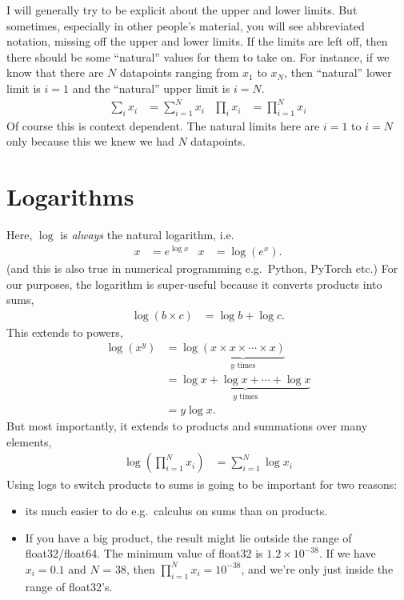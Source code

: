 \documentclass{article}
\begin{document}
I will generally try to be explicit about the upper and lower limits.
But sometimes, especially in other people's material, you will see abbreviated notation, missing off the upper and lower limits.
If the limits are left off, then there should be some ``natural'' values for them to take on.
For instance, if we know that there are $N$ datapoints ranging from $x_1$ to $x_N$, then ``natural'' lower limit is $i=1$ and the ``natural'' upper limit is $i=N$.
\begin{align}
  \sum_i x_i &= \sum_{i=1}^N x_i & \prod_i x_i &= \prod_{i=1}^N x_i
\end{align}
Of course this is context dependent.  The natural limits here are $i=1$ to $i=N$ only because this we knew we had $N$ datapoints.

\section{Logarithms}
Here, $\log$ is \textit{always} the natural logarithm, i.e.\
\begin{align}
  x &= e^{\log x} & x &= \log(e^x).
\end{align}
(and this is also true in numerical programming e.g.\ Python, PyTorch etc.)
For our purposes, the logarithm is super-useful because it converts products into sums,
\begin{align}
  \log(b\times c) &= \log b + \log c.
\end{align}
This extends to powers,
\begin{align}
  \log(x^y) &= \log \underbrace{(x \times x \times \dotsm \times x)}_{y \text{ times}}\\ 
  &= \underbrace{\log x + \log x + \dotsm + \log x}_{y \text { times}}\\
  &= y \log x.
\end{align}
But most importantly, it extends to products and summations over many elements,
\begin{align}
  \log(\prod_{i=1}^N x_i) &= \sum_{i=1}^N \log x_i
\end{align}
Using logs to switch products to sums is going to be important for two reasons:
\begin{itemize}
  \item its much easier to do e.g.\ calculus on sums than on products.
  \item If you have a big product, the result might lie outside the range of float32/float64.  The minimum value of float32 is $1.2\times10^{-38}$.  If we have $x_i=0.1$ and $N$ = 38, then $\prod_{i=1}^N x_i = 10^{-38}$, and we're only just inside the range of float32's.
\end{itemize}
\end{document}
